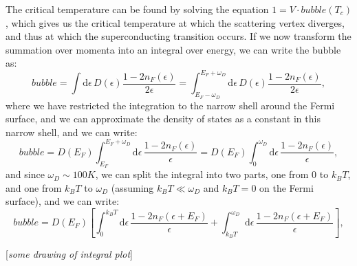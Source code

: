 The critical temperature can be found by solving the equation \(1 = V \cdot bubble(T_c)\), which gives us the critical temperature at which the scattering vertex diverges, and thus at which the superconducting transition occurs. If we now transform the summation over momenta into an integral over energy, we can write the bubble as:
\[
    bubble = \int \mathrm{d} \epsilon \, D(\epsilon) \frac{1 - 2 n_F(\epsilon)}{2 \epsilon} = \int_{E_F-\omega_D}^{E_F+\omega_D} \mathrm{d} \epsilon \, D(\epsilon) \frac{1 - 2 n_F(\epsilon)}{2 \epsilon},
\]
where we have restricted the integration to the narrow shell around the Fermi surface, and we can approximate the density of states as a constant in this narrow shell, and we can write:
\[
    bubble = D(E_F) \int_{E_F}^{E_F + \omega_D} \mathrm{d} \epsilon \, \frac{1 - 2 n_F(\epsilon)}{\epsilon} = D(E_F) \int_{0}^{\omega_D} \mathrm{d} \epsilon \, \frac{1 - 2 n_F(\epsilon)}{\epsilon},
\]
and since \(\omega_D \sim 100K\), we can split the integral into two parts, one from \(0\) to \(k_B T\), and one from \(k_B T\) to \(\omega_D\) (assuming \(k_B T \ll \omega_D\) and \(k_B T = 0\) on the Fermi surface), and we can write:
\[
    bubble = D(E_F) \left[ \int_{0}^{k_B T} \mathrm{d} \epsilon \, \frac{1 - 2 n_F(\epsilon + E_F)}{\epsilon} + \int_{k_B T}^{\omega_D} \mathrm{d} \epsilon \, \frac{1 - 2 n_F(\epsilon + E_F)}{\epsilon} \right],
\]

[\textit{some drawing of integral plot}]

